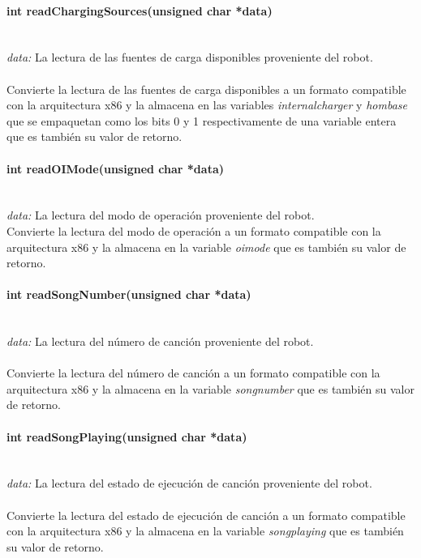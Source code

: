 \documentclass[letterpaper,openright,12pt]{book}
\begin{document}
\paragraph{int readChargingSources(unsigned char *data)}\mbox{}\\
\emph{data: }La lectura de las fuentes de carga disponibles proveniente del robot.\\\\
Convierte la lectura de las fuentes de carga disponibles a un formato compatible con la arquitectura x86 y la almacena en las variables \emph{internalcharger} y \emph{hombase} que se empaquetan como los bits 0 y 1 respectivamente de una variable entera que es también su valor de retorno.\\ 

\paragraph{int readOIMode(unsigned char *data)}\mbox{}\\
\emph{data: }La lectura del modo de operación proveniente del robot.\\
Convierte la lectura del modo de operación a un formato compatible con la arquitectura x86 y la almacena en la variable \emph{oimode} que es también su valor de retorno.\\ 

\paragraph{int readSongNumber(unsigned char *data)}\mbox{}\\
\emph{data: }La lectura del número de canción proveniente del robot.\\\\
Convierte la lectura del número de canción a un formato compatible con la arquitectura x86 y la almacena en la variable \emph{songnumber} que es también su valor de retorno.\\ 

\paragraph{int readSongPlaying(unsigned char *data)}\mbox{}\\
\emph{data: }La lectura del estado de ejecución de canción proveniente del robot.\\\\
Convierte la lectura del estado de ejecución de canción a un formato compatible con la arquitectura x86 y la almacena en la variable \emph{songplaying} que es también su valor de retorno.\\ 
\end{document}
